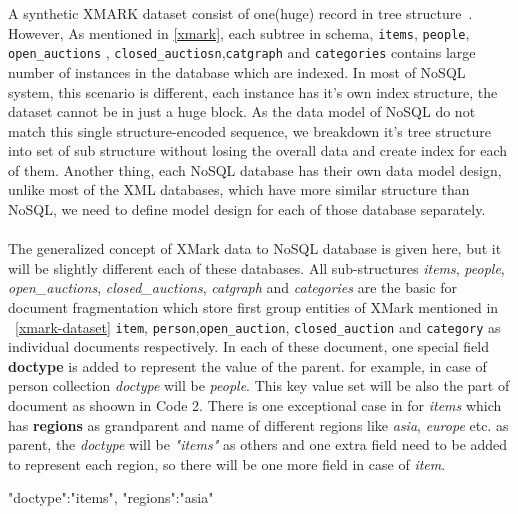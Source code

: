A synthetic XMARK dataset consist of one(huge) record in tree structure~\cite{xmark/VIST}. However, As mentioned in \ref{xmark}, each subtree in schema, \texttt{items}, \texttt{people}, \texttt{open\_auctions} , \texttt{closed\_auctiosn},\texttt{catgraph} and \texttt{categories} contains large number of instances in the database which are indexed. In most of NoSQL system, this scenario is different, each instance has it's own index structure, the dataset cannot be in just a huge block. As the data model of NoSQL do not match this single structure-encoded sequence, we breakdown it's tree structure into set of sub structure without losing the overall data and create index for each of them.
Another thing, each NoSQL database has their own data model design, unlike most of the XML databases, which have more similar structure than NoSQL, we need to define model design for each of those database separately. 
\\
\\
The generalized concept of XMark data to NoSQL database is given here, but it will be slightly different each of these databases.
 All sub-structures \textit{items}, \textit{people}, \textit{open\_auctions}, \textit{closed\_auctions}, \textit{catgraph} and \textit{categories} are the basic for document fragmentation which store first group entities of XMark mentioned in ~\ref{xmark-dataset} \texttt{item}, \texttt{person},\texttt{open\_auction}, \texttt{closed\_auction} and \texttt{category} as individual documents respectively. In each of these document, one special field \textbf{doctype} is added to represent the value of the parent. for example, in case of person collection \textit{doctype} will be \textit{people}. This key value set will be also the part of document as shoown in Code 2. There is one exceptional case in for \textit{items}  which has \textbf{regions} as grandparent and name of different regions like \textit{asia}, \textit{europe} etc. as parent, the \textit{doctype} will be \textit{"items"} as others and one extra field need to be added to represent each region, so there will be one more field in case of \textit{item}.

 \begin{fakeJSON}[label=json,caption=\textit{doctype} and \textit{regions} for item which has region name \textit{asia}]
 	"doctype":"items",
 	"regions":"asia"
 \end{fakeJSON}
 
